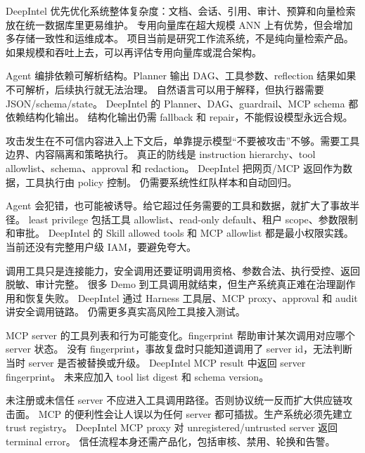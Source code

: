 {DeepIntel 优先优化系统整体复杂度：文档、会话、引用、审计、预算和向量检索放在统一数据库里更易维护。}
{专用向量库在超大规模 ANN 上有优势，但会增加多存储一致性和运维成本。}
{项目当前是研究工作流系统，不是纯向量检索产品。}
{如果规模和吞吐上去，可以再评估专用向量库或混合架构。}

{Agent 编排依赖可解析结构。Planner 输出 DAG、工具参数、reflection 结果如果不可解析，后续执行就无法治理。}
{自然语言可以用于解释，但执行器需要 JSON/schema/state。}
{DeepIntel 的 Planner、DAG、guardrail、MCP schema 都依赖结构化输出。}
{结构化输出仍需 fallback 和 repair，不能假设模型永远合规。}

{攻击发生在不可信内容进入上下文后，单靠提示模型“不要被攻击”不够。需要工具边界、内容隔离和策略执行。}
{真正的防线是 instruction hierarchy、tool allowlist、schema、approval 和 redaction。}
{DeepIntel 把网页/MCP 返回作为数据，工具执行由 policy 控制。}
{仍需要系统性红队样本和自动回归。}

{Agent 会犯错，也可能被诱导。给它超过任务需要的工具和数据，就扩大了事故半径。}
{least privilege 包括工具 allowlist、read-only default、租户 scope、参数限制和审批。}
{DeepIntel 的 Skill allowed tools 和 MCP allowlist 都是最小权限实践。}
{当前还没有完整用户级 IAM，要避免夸大。}

{调用工具只是连接能力，安全调用还要证明调用资格、参数合法、执行受控、返回脱敏、审计完整。}
{很多 Demo 到工具调用就结束，但生产系统真正难在治理副作用和恢复失败。}
{DeepIntel 通过 Harness 工具层、MCP proxy、approval 和 audit 讲安全调用链路。}
{仍需更多真实高风险工具接入测试。}

{MCP server 的工具列表和行为可能变化。fingerprint 帮助审计某次调用对应哪个 server 状态。}
{没有 fingerprint，事故复盘时只能知道调用了 server id，无法判断当时 server 是否被替换或升级。}
{DeepIntel MCP result 中返回 server fingerprint。}
{未来应加入 tool list digest 和 schema version。}

{未注册或未信任 server 不应进入工具调用路径。否则协议统一反而扩大供应链攻击面。}
{MCP 的便利性会让人误以为任何 server 都可插拔。生产系统必须先建立 trust registry。}
{DeepIntel MCP proxy 对 unregistered/untrusted server 返回 terminal error。}
{信任流程本身还需产品化，包括审核、禁用、轮换和告警。}

